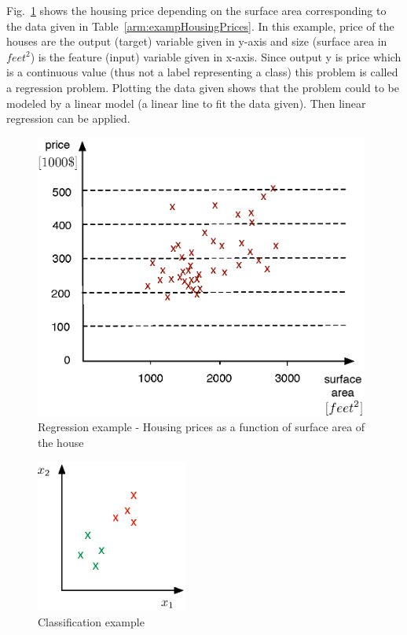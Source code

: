 Fig.~\ref{fig:housingPrices} shows the housing price depending on the surface area corresponding to the data given in Table~\ref{arm:exampHousingPrices}.
In this example, price of the houses are the output (target) variable given in y-axis and size (surface area in $feet^2$) is the feature (input) variable given in x-axis. 
Since output y is price which is a continuous value (thus not a label representing a class) this problem is called a regression problem. Plotting the data given shows that the problem could to be modeled by a linear model (a linear line to fit the data given). Then linear regression can be applied.

\begin{figure}
\begin{center}
\includegraphics[width=11cm]{figures/linearRegressionExamp}    %
\caption{Regression example - Housing prices as a function of surface area of the house \cite{andrewNg_MachLearning}} 
\label{fig:housingPrices}
\end{center}
\end{figure}

\begin{figure}
\begin{center}
\includegraphics[width=5cm]{figures/classificationEx2}    %
\caption{Classification example} 
\label{fig:classificationEx2}
\end{center}
\end{figure}

